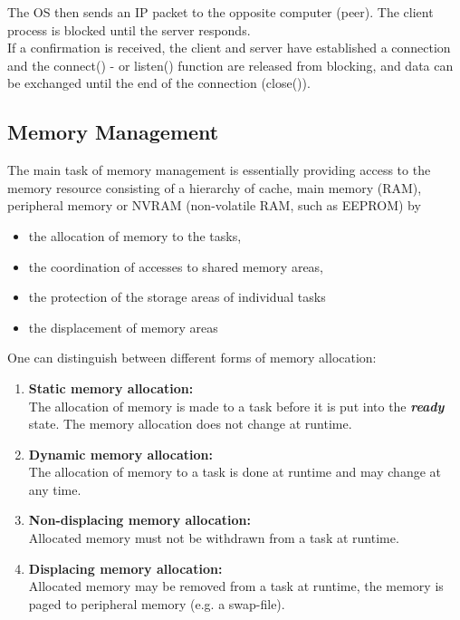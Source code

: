 The OS then sends an IP packet to the opposite computer (peer). The client process is blocked until the server responds.\\

If a confirmation is received, the client and server have established a connection and the connect() - or listen() function are released from blocking, and data can be exchanged until the end of the connection (close()).


\subsection{Memory Management}

The main task of memory management is essentially providing access to the memory resource consisting of a hierarchy of cache, main memory (RAM), peripheral memory or NVRAM (non-volatile RAM, such as EEPROM) by

\begin{itemize}
	\item  the allocation of memory to the tasks,
	\item  the coordination of accesses to shared memory areas,
	\item  the protection of the storage areas of individual tasks
	\item  the displacement of memory areas
\end{itemize}

One can distinguish between different forms of memory allocation:

\begin{enumerate}
\item  \textbf{Static memory allocation: \\}The allocation of memory is made to a task before it is put into the \textbf{\textit{ready}} state. The memory allocation does not change at runtime.

\item  \textbf{Dynamic memory allocation: }\\The allocation of memory to a task is done at runtime and may change at any time.

\item  \textbf{Non-displacing memory allocation: }\\Allocated memory must not be withdrawn from a task at runtime.

\item  \textbf{Displacing memory allocation: }\\Allocated memory may be removed from a task at runtime, the memory is paged to peripheral memory (e.g. a swap-file).
\end{enumerate}

